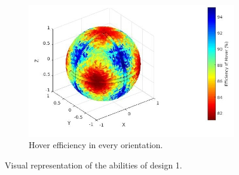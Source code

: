 \begin{figure}[!ht]
\begin{center}
\begin{subfigure}[b]{0.45\textwidth}
    \includegraphics[width=\linewidth]{images/Quad_design_2_hspace.jpg}
    \caption{Hover efficiency in every orientation.} \label{fig:deisgn1_hspace}
  \end{subfigure}
  \caption{Visual representation of the abilities of design 1.}
  \label{fig:Quadcopter1_spaces}
  \end{center}
\end{figure}


